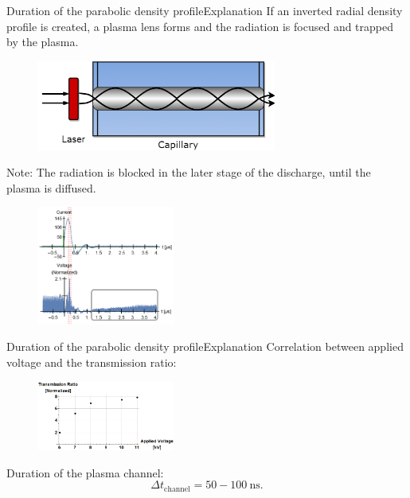 \documentclass[]{beamer}
\begin{document}
  \begin{frame}{Duration of the parabolic density profile}{Explanation}
    If an inverted radial density profile is created, a plasma lens forms and the radiation is focused and trapped by the plasma.
    \begin{figure}
      \includegraphics[width=0.7\textwidth]{figures/results/oscillator/chen4_31.png}
    \end{figure}
    Note: The radiation is blocked in the later stage of the discharge, until the plasma is diffused.
    \begin{figure}
      \includegraphics[width=0.4\textwidth]{figures/results/oscillator/not_opaque.PNG}
    \end{figure}
  \end{frame}
  \begin{frame}{Duration of the parabolic density profile}{Explanation}
    Correlation between applied voltage and the transmission ratio:
    \begin{figure}
      \includegraphics[width=0.4\textwidth]{figures/results/oscillator/voltage vs guiding.png}
    \end{figure}
    Duration of the plasma channel:
    \begin{equation*}
      \Delta t_\text{channel}=50 -100\ \si{\ns}.
    \end{equation*}
  \end{frame}
\end{document}
